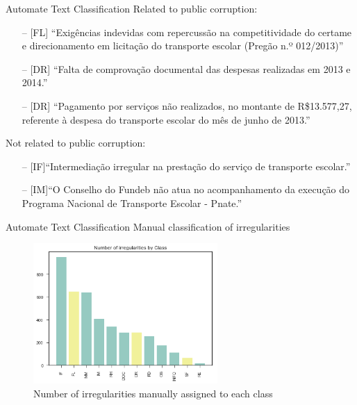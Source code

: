 \documentclass[handout,t,usenames,dvipsnames]{beamer}
\begin{document}
\begin{frame}{Automate Text Classification}
\justifying
\small
Related to public corruption:

\begin{itemize}
\justifying
    \item[--] {\color{emap-azul-escuro}[FL]} ``Exigências indevidas com repercussão na competitividade do certame e direcionamento em licitação do transporte escolar (Pregão n.º 012/2013)''
    \item[--] {\color{emap-azul-escuro}[DR]} ``Falta de comprovação documental das despesas realizadas em 2013 e 2014.''
    \item[--] {\color{emap-azul-escuro}[DR]} ``Pagamento por serviços não realizados, no montante de R\$13.577,27, referente à despesa do transporte escolar do mês de junho de 2013.''
\end{itemize}
\vspace{0.5em}

Not related to public corruption: 
\begin{itemize}
\justifying
    \item[--] {\color{emap-azul-escuro}[IF]}``Intermediação irregular na prestação do serviço de transporte escolar.''
    \item[--] {\color{emap-azul-escuro}[IM]}``O Conselho do Fundeb não atua no acompanhamento da execução do Programa Nacional de Transporte Escolar - Pnate.''


\end{itemize}

\end{frame}

\begin{frame}{Automate Text Classification}
\justifying
{\color{emap-azul-escuro}\large Manual classification of irregularities}
\vspace{0.5em}

\begin{figure}[h!]
\includegraphics[width=7cm]{irreg_class.png}
\centering
\caption{Number of irregularities manually assigned to each class}
\end{figure}
 
\end{frame}
\end{document}
